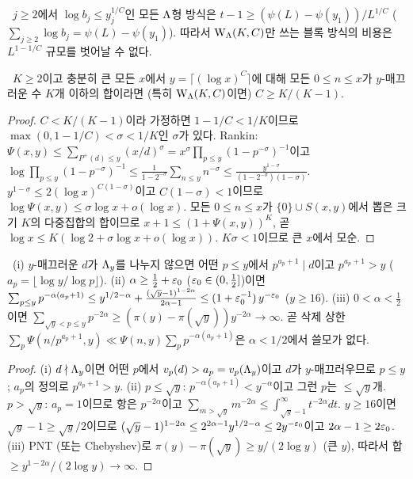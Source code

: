 \begin{remark}\label{STRUCT:rem-smooth-count}
\PROVED\ $j\ge2$에서 $\log b_j\le y_j^{1/C}$인 모든 $\Lambda$형 방식은 $t-1\ge(\psi(L)-\psi(y_1))/L^{1/C}$ ($\sum_{j\ge2}\log b_j=\psi(L)-\psi(y_1)$). 따라서 $\mathrm W_\Lambda(K,C)$만 쓰는 블록 방식의 비용은 $L^{1-1/C}$ 규모를 벗어날 수 없다.
\end{remark}

\begin{proposition}[엔트로피 문턱: $C\ge K/(K-1)$]\label{STRUCT:prop-entropy-W}
\PROVED\ $K\ge2$이고 충분히 큰 모든 $x$에서 $y=\lceil(\log x)^C\rceil$에 대해 모든 $0\le n\le x$가 $y$-매끄러운 수 $K$개 이하의 합이라면 (특히 $\mathrm W_\Lambda(K,C)$이면) $C\ge K/(K-1)$.
\end{proposition}
\begin{proof}
$C<K/(K-1)$이라 가정하면 $1-1/C<1/K$이므로 $\max(0,1-1/C)<\sigma<1/K$인 $\sigma$가 있다.
Rankin: $\Psi(x,y)\le\sum_{P^+(d)\le y}(x/d)^\sigma=x^\sigma\prod_{p\le y}(1-p^{-\sigma})^{-1}$이고
$\log\prod_{p\le y}(1-p^{-\sigma})^{-1}\le\frac{1}{1-2^{-\sigma}}\sum_{n\le y}n^{-\sigma}\le\frac{y^{1-\sigma}}{(1-2^{-\sigma})(1-\sigma)}$.
$y^{1-\sigma}\le2(\log x)^{C(1-\sigma)}$이고 $C(1-\sigma)<1$이므로 $\log\Psi(x,y)\le\sigma\log x+o(\log x)$. 모든 $0\le n\le x$가 $\{0\}\cup S(x,y)$에서 뽑은 크기 $K$의 다중집합의 합이므로 $x+1\le(1+\Psi(x,y))^K$, 곧 $\log x\le K(\log2+\sigma\log x+o(\log x))$. $K\sigma<1$이므로 큰 $x$에서 모순.
\end{proof}

\begin{lemma}\label{STRUCT:lem-deletion}
\PROVED\ (i) $y$-매끄러운 $d$가 $\Lambda_y$를 나누지 않으면 어떤 $p\le y$에서 $p^{a_p+1}\mid d$이고 $p^{a_p+1}>y$ ($a_p=\lfloor\log y/\log p\rfloor$).
(ii) $\alpha\ge\frac12+\varepsilon_0$ ($\varepsilon_0\in(0,\frac12]$)이면 $\sum_{p\le y}p^{-\alpha(a_p+1)}\le y^{1/2-\alpha}+\frac{(\sqrt y-1)^{1-2\alpha}}{2\alpha-1}\le(1+\varepsilon_0^{-1})\,y^{-\varepsilon_0}$ ($y\ge16$).
(iii) $0<\alpha<\frac12$이면 $\sum_{\sqrt y<p\le y}p^{-2\alpha}\ge(\pi(y)-\pi(\sqrt y))y^{-2\alpha}\to\infty$. 곧 삭제 상한 $\sum_p\Psi(n/p^{a_p+1},y)\ll\Psi(n,y)\sum_pp^{-\alpha(a_p+1)}$은 $\alpha<1/2$에서 쓸모가 없다.
\end{lemma}
\begin{proof}
(i) $d\nmid\Lambda_y$이면 어떤 $p$에서 $v_p(d)>a_p=v_p(\Lambda_y)$이고 $d$가 $y$-매끄러우므로 $p\le y$; $a_p$의 정의로 $p^{a_p+1}>y$.
(ii) $p\le\sqrt y$: $p^{-\alpha(a_p+1)}<y^{-\alpha}$이고 그런 $p$는 $\le\sqrt y$개. $p>\sqrt y$: $a_p=1$이므로 항은 $p^{-2\alpha}$이고 $\sum_{m>\sqrt y}m^{-2\alpha}\le\int_{\sqrt y-1}^\infty t^{-2\alpha}dt$. $y\ge16$이면 $\sqrt y-1\ge\sqrt y/2$이므로 $(\sqrt y-1)^{1-2\alpha}\le2^{2\alpha-1}y^{1/2-\alpha}\le2y^{-\varepsilon_0}$이고 $2\alpha-1\ge2\varepsilon_0$.
(iii) PNT (또는 Chebyshev)로 $\pi(y)-\pi(\sqrt y)\ge y/(2\log y)$ (큰 $y$), 따라서 합 $\ge y^{1-2\alpha}/(2\log y)\to\infty$.
\end{proof}

